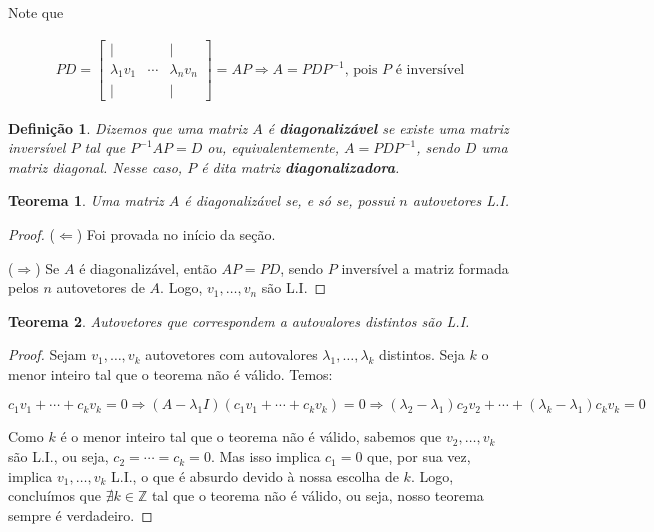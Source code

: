 \documentclass{article}
\newtheorem{theorem}{Teorema}[section]
\newtheorem*{definition}{Definição}
\begin{document}
\par\vspace{0.3cm} Note que 

\begin{align*}
PD = \begin{bmatrix}
\vert &  & \vert \\
\lambda_1 v_1 & \cdots & \lambda_n v_n \\
\vert &  & \vert 
\end{bmatrix} = AP \Rightarrow A = PDP^{-1}\text{, pois $P$ é inversível}
\end{align*}

\begin{definition}
	Dizemos que uma matriz $A$ é \textbf{diagonalizável} se existe uma matriz inversível $P$ tal que $P^{-1}AP = D$ ou, equivalentemente, $A = PDP^{-1}$, sendo $D$ uma matriz diagonal. Nesse caso, $P$ é dita matriz \textbf{diagonalizadora}.
\end{definition}

\begin{theorem}
	Uma matriz $A$ é diagonalizável se, e só se, possui $n$ autovetores L.I.
\end{theorem}

\begin{proof}
	($\Leftarrow$) Foi provada no início da seção.
	
	\par\vspace{0.3cm}\hspace{16pt}($\Rightarrow$) Se $A$ é diagonalizável, então $AP = PD$, sendo $P$ inversível a matriz formada pelos $n$ autovetores de $A$. Logo, $v_1, \dots, v_n$ são L.I.
\end{proof}

\begin{theorem}
	Autovetores que correspondem a autovalores distintos são L.I.
\end{theorem}

\begin{proof}
	Sejam $v_1, \dots, v_k$ autovetores com autovalores $\lambda_1, \dots, \lambda_k$ distintos. Seja $k$ o menor inteiro tal que o teorema não é válido. Temos:
	
	\begin{equation*}
	c_1v_1 + \cdots + c_kv_k = 0 \Rightarrow (A-\lambda_1 I)(c_1v_1+\cdots+c_kv_k) = 0 \Rightarrow (\lambda_2 - \lambda_1)c_2v_2 +\cdots+(\lambda_k-\lambda_1)c_kv_k = 0
	\end{equation*}
	
	\par\vspace{0.3cm} Como $k$ é o menor inteiro tal que o teorema não é válido, sabemos que $v_2, \dots, v_k$ são L.I., ou seja, $c_2 = \cdots = c_k = 0$. Mas isso implica $c_1 = 0$ que, por sua vez, implica $v_1, \dots, v_k$ L.I., o que é absurdo devido à nossa escolha de $k$. Logo, concluímos que $\nexists k\in\mathbb{Z}$ tal que o teorema não é válido, ou seja, nosso teorema sempre é verdadeiro. 
	
\end{proof}
\end{document}
